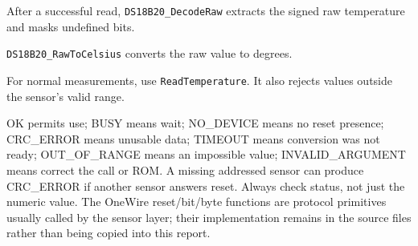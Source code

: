 After a successful read, \texttt{DS18B20\_DecodeRaw} extracts the signed raw
temperature and masks undefined bits.

\texttt{DS18B20\_RawToCelsius} converts the raw value to degrees.

For normal measurements, use \texttt{ReadTemperature}. It also rejects values
outside the sensor's valid range.

OK permits use; BUSY means wait; NO\_DEVICE means no reset presence; CRC\_ERROR
means unusable data; TIMEOUT means conversion was not ready; OUT\_OF\_RANGE means
an impossible value; INVALID\_ARGUMENT means correct the call or ROM. A missing
addressed sensor can produce CRC\_ERROR if another sensor answers reset. Always
check status, not just the numeric value. The OneWire reset/bit/byte functions
are protocol primitives usually called by the sensor layer; their implementation
remains in the source files rather than being copied into this report.
